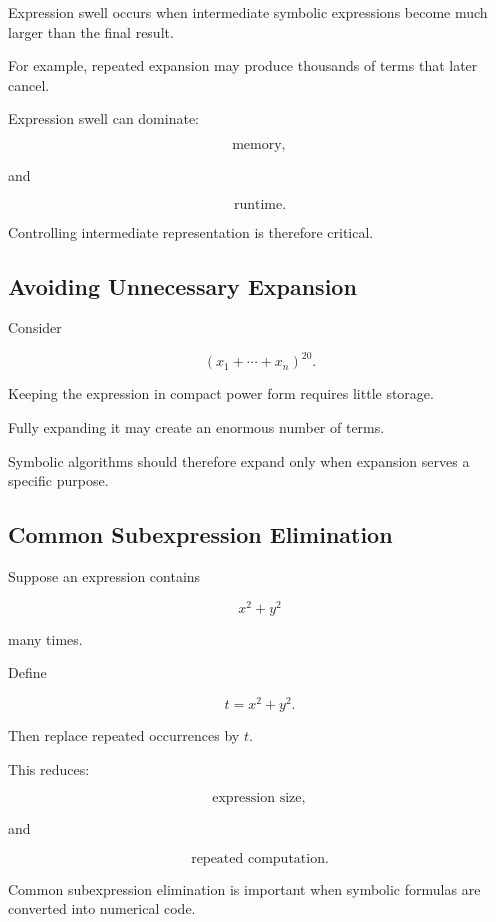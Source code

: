 Expression swell occurs when intermediate symbolic expressions become much
larger than the final result.

For example, repeated expansion may produce thousands of terms that later
cancel.

Expression swell can dominate:

\[
\boxed{
\text{memory},
}
\]

and

\[
\boxed{
\text{runtime}.
}
\]

Controlling intermediate representation is therefore critical.

\subsection{Avoiding Unnecessary Expansion}
\label{subsec:avoid-unnecessary-expansion}

Consider

\[
(x_1+\cdots+x_n)^{20}.
\]

Keeping the expression in compact power form requires little storage.

Fully expanding it may create an enormous number of terms.

Symbolic algorithms should therefore expand only when expansion serves a
specific purpose.

\subsection{Common Subexpression Elimination}
\label{subsec:common-subexpression-elimination}

Suppose an expression contains

\[
x^2+y^2
\]

many times.

Define

\[
\boxed{
t=x^2+y^2.
}
\]

Then replace repeated occurrences by \(t\).

This reduces:

\[
\boxed{
\text{expression size},
}
\]

and

\[
\boxed{
\text{repeated computation}.
}
\]

Common subexpression elimination is important when symbolic formulas are
converted into numerical code.

